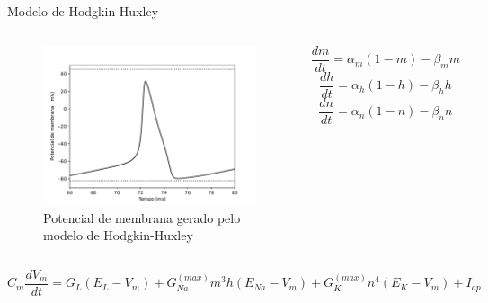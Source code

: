 \begin{frame}{Modelo de Hodgkin-Huxley}
		\begin{columns}[t]
		\column{5cm}
			\begin{figure}[tb]
				\centering
				\caption{Potencial de membrana gerado pelo modelo de Hodgkin-Huxley}
				\label{fig:hhvm}
				\includegraphics[width=0.8\linewidth]{figs/hh_vm}
			\end{figure}
		\column{5cm}
			\[
				\frac{dm}{dt}=\alpha_m(1-m)-\beta_mm
			\]\[
				\frac{dh}{dt}=\alpha_h(1-h)-\beta_hh
			\]\[
				\frac{dn}{dt}=\alpha_n(1-n)-\beta_nn
			\]
	\end{columns}
	
	\[
		C_m\frac{dV_m}{dt}=G_L(E_L-V_m)+G_{Na}^{(max)}m^3h(E_{Na}-V_m)+G_K^{(max)}n^4(E_K-V_m)+I_{ap}
	\]
\end{frame}
